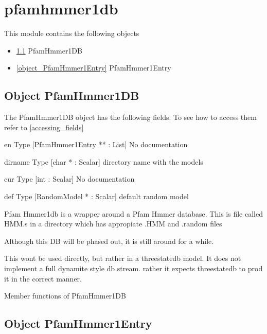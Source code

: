 \section{pfamhmmer1db}
\label{module_pfamhmmer1db}
This module contains the following objects

\begin{itemize}
\item \ref{object_PfamHmmer1DB} PfamHmmer1DB

\item \ref{object_PfamHmmer1Entry} PfamHmmer1Entry

\end{itemize}
\subsection{Object PfamHmmer1DB}

\label{object_PfamHmmer1DB}

The PfamHmmer1DB object has the following fields. To see how to access them refer to \ref{accessing_fields}
\begin{description}
\item{en} Type [PfamHmmer1Entry ** : List] No documentation

\item{dirname} Type [char * : Scalar]  directory name with the models

\item{cur} Type [int : Scalar] No documentation

\item{def} Type [RandomModel * : Scalar]  default random model

\end{description}


Pfam Hmmer1db is a wrapper around a Pfam Hmmer database.  This is file
called HMM.s in a directory which has appropiate .HMM and .random
files


Although this DB will be phased out, it is still around for a while.


This wont be used directly, but rather in a threestatedb model. 
It does not implement a full dynamite style db stream. rather it expects
threestatedb to prod it in the correct manner.






Member functions of PfamHmmer1DB

\subsection{Object PfamHmmer1Entry}

